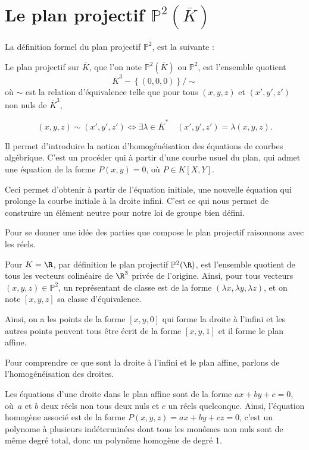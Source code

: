 \chapter{Le plan projectif $\mathbb{P}^2(\overline{K})$}

La définition formel du plan projectif $\mathbb{P}^2$, est la suivante :

\begin{def}
    Le plan projectif sur $\overline{K}$, que l'on note $\mathbb{P}^2(\overline{K})$ ou
    $\mathbb{P}^2$, est l'ensemble quotient
    \[
    \overline{K}^3 - \left\{ (0,0,0) \right\} / \sim
    \] 
    où $\sim$ est la relation d'équivalence telle que pour tous $\left( x,y,z \right) $ et
    $\left( x',y',z'\right) $ non nuls de $\overline{K}^3$,

    \[
    \left( x,y,z \right) \sim \left( x',y',z' \right) \iff \exists \lambda \in
    \overline{K}^{*} \quad \left( x',y',z' \right) = \lambda \left( x,y,z \right) 
    .\] 
\end{def}

Il permet d'introduire la notion d'homogénéisation des équations de courbes algébrique. C'est
un procéder qui à partir d'une courbe usuel du plan, qui admet une équation de la forme
$P(x,y)=0$, où $P \in K[X,Y]$.

Ceci permet d'obtenir à partir de l'équation initiale, une nouvelle équation qui prolonge la
courbe initiale à la droite infini. C'est ce qui nous permet de construire un élément neutre
pour notre loi de groupe bien défini.

Pour se donner une idée des parties que compose le plan projectif raisonnons avec les réels.

Pour $K=\R$, par définition le plan projectif $\mathbb{P}^2(\R)$, est l'ensemble quotient de
tous les vecteurs colinéaire de $\R^3$ privée de l'origine. Ainsi, pour tous vecteurs $(x,y,z)
\in \mathbb{P}^2$, un représentant de classe est de la forme $\left( \lambda x, \lambda y,
\lambda z \right) $, et on note $\left[ x,y,z \right] $ sa classe d'équivalence. 

Ainsi, on a les points de la forme $\left[ x,y,0 \right] $ qui forme la droite à l'infini et
les autres points peuvent tous être écrit de la forme $\left[ x,y,1 \right] $ et il forme le
plan affine.

Pour comprendre ce que sont la droite à l'infini et le plan affine, parlons de
l'homogénéisation des droites.

Les équations d'une droite dans le plan affine sont de la forme $ax + by + c = 0$, où $a$ et
$b$ deux réels non tous deux nuls et $c$ un réels quelconque. Ainsi, l'équation homogène
associé est de la forme $P(x,y,z) = ax + by + cz = 0$, c'est un polynome à plusieurs
indéterminées dont tous les monômes non nuls sont de même degré total, donc un polynôme
homogène de degré 1.

